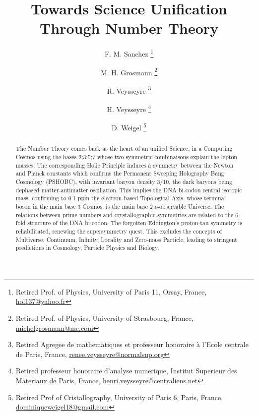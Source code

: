 \documentclass[a4paper,9pt]{article}
\title{Towards Science Unification Through Number Theory}
\author{F. M. Sanchez \thanks{Retired Prof. of Physics, University of Paris 11, Orsay, France, \href{mailto:hol137@yahoo.fr}{hol137@yahoo.fr}} 
   \and M. H. Grosmann \thanks{Retired Prof. of Physics, University of Strasbourg, France, \href{mailto:michelgrosmann@me.com}{michelgrosmann@me.com}}
   \and R. Veysseyre \thanks{Retired Agregee de mathematiques et professeur honoraire \`a l'Ecole centrale de Paris, France,
   \href{mailto:renee.veysseyre@normalsup.org}{renee.veysseyre@normalsup.org}}
   \and H. Veysseyre \thanks{Retired professeur honoraire d'analyse numerique, Institut Superieur des Materiaux de Paris, France,
   \href{mailto:henri.veysseyre@centraliens.net}{henri.veysseyre@centraliens.net}}
   \and D. Weigel  \thanks{Retired Prof of Cristallography, University of Paris 6, Paris, France, \href{mailto:dominiqueweigel18@gmail.com}{dominiqueweigel18@gmail.com}} 
   }
\newcounter{col}
\begin{document}
\setcounter{page}{1}

\maketitle

\begin{abstract}








The Number Theory comes back as the heart of an unified Science, in a Computing Cosmos using the bases 2;3;5;7 whose two symmetric combinaisons explain the lepton masses. The corresponding Holic Principle induces a symmetry between the Newton and Planck constants which confirms the Permanent Sweeping Holography Bang Cosmology (PSHOBC), with invariant baryon density 3/10, the dark baryons being dephased matter-antimatter oscillation.
This implies the DNA bi-codon central isotopic mass, confirming to 0.1 ppm the electron-based Topological Axis, whose terminal boson in the main base 3 Cosmos, is the main base 2 $c$-observable Universe. The relations between prime numbers and crystallographic symmetries are related to the 6-fold structure of the DNA bi-codon. The forgotten Eddington's proton-tau symmetry is rehabilitated, renewing the supersymmetry quest. This excludes the concepts of Multiverse, Continuum, Infinity, Locality and Zero-mass Particle, leading to stringent predictions in Cosmology, Particle Physics and Biology. 

 


\end{abstract}
\end{document}
